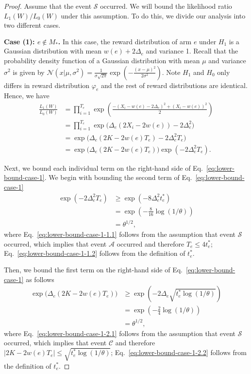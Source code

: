 \documentclass{article}
\newcommand{\Rew}{\varphi}
\begin{document}
\begin{proof}
Assume that the event $\mathcal S$ occurred.
We will bound the likelihood ratio $L_1(W)/L_0(W)$ under this assumption. 
To do this, we divide our analysis into two different cases.

\textbf{Case (1): $e\not \in M_*$.}
In this case, the reward distribution of arm $e$ under $H_1$ is a Gaussian distribution with mean $w(e)+2\Delta_e$ and variance 1. 
Recall that the probability density function of a Gaussian distribution with mean $\mu$ and variance $\sigma^2$ is given by
$\mathcal N(x | \mu,\sigma^2)=\frac{1}{\sigma\sqrt{2\pi}}\exp\left(-\frac{(x-\mu)^2}{2\sigma^2}\right)$.
Note $H_1$ and $H_0$ only differs in reward distribution $\Rew_e$ and the rest of reward distributions are identical.
Hence, we have
\begin{align}
  \frac{L_1(W)}{L_0(W)} &= \prod_{i=1}^{T_e} \exp\left(\frac{-(X_i-w(e)-2\Delta_e)^2+(X_i-w(e))^2}{2}\right) \nonumber \\
  						&= \prod_{i=1}^{T_e} \exp\big(\Delta_e(2X_i-2w(e))-2\Delta_e^2\big) \nonumber \\
  						&= \exp\big(\Delta_e(2K-2w(e)T_e)-2\Delta_e^2T_e\big) \nonumber \\
  						&= \exp\big(\Delta_e(2K-2w(e)T_e)\big)\exp(-2\Delta_e^2T_e) \label{eq:lower-bound-case-1}.
\end{align}

Next, we bound each individual term on the right-hand side of Eq.~\eqref{eq:lower-bound-case-1}.
We begin with bounding the second term of Eq.~\eqref{eq:lower-bound-case-1}
\begin{align}
	\exp(-2\Delta_e^2T_e) &\ge \exp(-8\Delta_e^2t_e^*) \label{eq:lower-bound-case-1-1.1} \\
						  &=\exp\left(-\frac{8}{16}\log(1/\theta)\right) \label{eq:lower-bound-case-1-1.2}\\
						  &= \theta^{1/2}\label{eq:lower-bound-case-1-1.3},
\end{align}
where Eq.~\eqref{eq:lower-bound-case-1-1.1} follows from the assumption that event $\mathcal S$ occurred, which implies that event $\mathcal A$ occurred and therefore $T_e \le 4t_e^*$; Eq.~\eqref{eq:lower-bound-case-1-1.2} follows from the definition of $t_e^*$.

Then, we bound the first term on the right-hand side of Eq.~\eqref{eq:lower-bound-case-1} as follows
\begin{align}
	\exp\big(\Delta_e(2K-2w(e)T_e)\big) & \ge \exp\left(-2\Delta_e\sqrt{t_e^*\log(1/\theta)}\right) \label{eq:lower-bound-case-1-2.1}\\
								       & = \exp\left(-\frac{2}{4}\log(1/\theta)\right) \label{eq:lower-bound-case-1-2.2}\\
								       &=\theta^{1/2},  \label{eq:lower-bound-case-1-2.3}
\end{align}
where Eq.~\eqref{eq:lower-bound-case-1-2.1} follows from the assumption that event $\mathcal S$ occurred, which implies that event $\mathcal C$ and therefore $|2K-2w(e)T_e| \le \sqrt{t_e^*\log(1/\theta)}$; 
Eq.~\eqref{eq:lower-bound-case-1-2.2} follows from the definition of $t_e^*$.


\end{proof}
\end{document}
